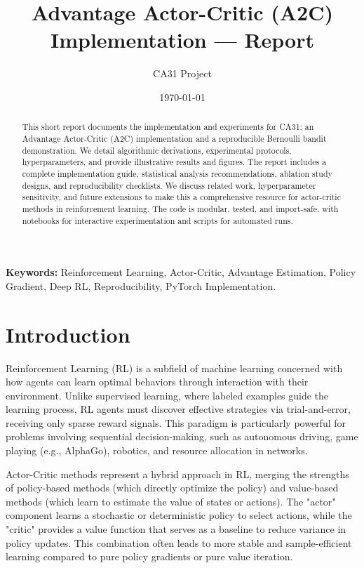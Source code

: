 \documentclass[11pt]{article}
\title{Advantage Actor-Critic (A2C) Implementation — Report}
\author{CA31 Project}
\date{\today}
\begin{document}
\maketitle
\tableofcontents
\listoffigures
\listoftables
\newpage
\begin{abstract}
This short report documents the implementation and experiments for CA31: an
Advantage Actor-Critic (A2C) implementation and a reproducible Bernoulli
bandit demonstration. We detail algorithmic derivations, experimental
protocols, hyperparameters, and provide illustrative results and figures.
The report includes a complete implementation guide, statistical analysis
recommendations, ablation study designs, and reproducibility checklists.
We discuss related work, hyperparameter sensitivity, and future extensions
to make this a comprehensive resource for actor-critic methods in reinforcement
learning. The code is modular, tested, and import-safe, with notebooks for
interactive experimentation and scripts for automated runs.
\end{abstract}

\textbf{Keywords:} Reinforcement Learning, Actor-Critic, Advantage Estimation,
Policy Gradient, Deep RL, Reproducibility, PyTorch Implementation.
\section{Introduction}
Reinforcement Learning (RL) is a subfield of machine learning concerned with how agents can learn optimal behaviors through interaction with their environment. Unlike supervised learning, where labeled examples guide the learning process, RL agents must discover effective strategies via trial-and-error, receiving only sparse reward signals. This paradigm is particularly powerful for problems involving sequential decision-making, such as autonomous driving, game playing (e.g., AlphaGo), robotics, and resource allocation in networks.

Actor-Critic methods represent a hybrid approach in RL, merging the strengths of policy-based methods (which directly optimize the policy) and value-based methods (which learn to estimate the value of states or actions). The "actor" component learns a stochastic or deterministic policy to select actions, while the "critic" provides a value function that serves as a baseline to reduce variance in policy updates. This combination often leads to more stable and sample-efficient learning compared to pure policy gradients or pure value iteration.
\end{document}
